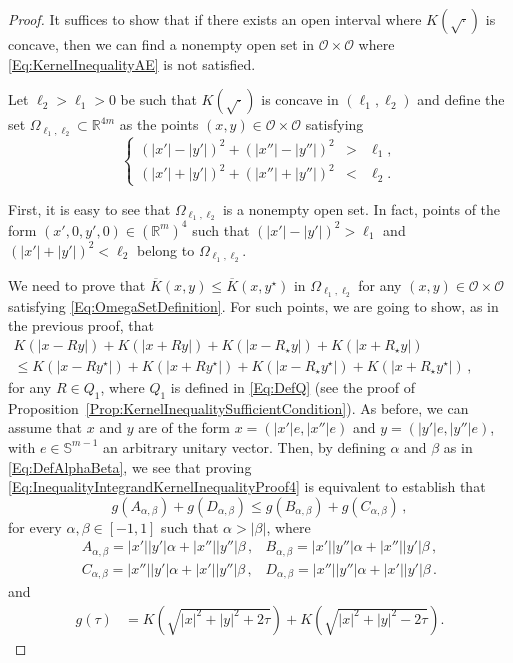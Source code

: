 \documentclass[12pt,reqno]{amsart}
\theoremstyle{definition}
\theoremstyle{remark}
\newcommand{\con}[1]{\mathbb{#1}}
\newcommand{\R}{\con{R}} %
\newcommand{\Sph}{\con{S}} %
\newcommand{\ocal}{\mathcal{O}}
\newcommand\beqc[1]{\left\{\begin{array}{#1}}
\newcommand\eeqc{\end{array} \right.}
\def\PDEsystem{rcll}
\numberwithin{equation}{section}
\begin{document}
\begin{proof}
	It suffices to show that if there exists an open interval where $K(\sqrt{\cdot})$ is concave, then we can find a nonempty open set in $\ocal \times \ocal$ where \eqref{Eq:KernelInequalityAE} is not satisfied.
	
	Let $\ell_2>\ell_1>0$ be such that $K(\sqrt{\cdot})$ is concave in $(\ell_1,\ell_2)$ and define the set $\Omega_{\ell_1,\ell_2}\subset \R^{4m}$ as the points $(x,y)\in \ocal\times \ocal$ satisfying
	\begin{equation}
	\label{Eq:OmegaSetDefinition}
	\beqc{\PDEsystem}
	(|x'|-|y'|)^2+(|x''|-|y''|)^2&>&\ell_1,\\
	(|x'|+|y'|)^2+(|x''|+|y''|)^2&<&\ell_2.
	\eeqc
	\end{equation}
	
	First, it is easy to see that $\Omega_{\ell_1,\ell_2}$ is a nonempty open set. In fact, points of the form $(x',0,y',0)\in (\R^m)^4$ such that $(|x'|-|y'|)^2>\ell_1$ and $(|x'|+|y'|)^2 <\ell_2$ belong to $\Omega_{\ell_1,\ell_2}$. 
	
	We need to prove that $\overline{K}(x,y) \leq \overline{K}(x, y^\star)$ in $\Omega_{\ell_1,\ell_2}$ for any $(x,y)\in \ocal\times \ocal$ satisfying \eqref{Eq:OmegaSetDefinition}. For such points, we are going to show, as in the previous proof, that
	\begin{equation}
	\label{Eq:InequalityIntegrandKernelInequalityProof4}
	\begin{split}
	K(|x - R y|) + K(|x + R y|) + K(|x - R_\star y|) + K(|x + R_\star y|)
	\quad \quad \quad \quad \quad \quad
	\\
	\leq
	K(|x - R y^\star|) + K(|x + R y^\star|)+K(|x - R_\star y^\star|) + K(|x + R_\star y^\star|)\,, 
	\end{split}
	\end{equation}
	for any $R\in Q_1$, where $Q_1$ is defined in \eqref{Eq:DefQ} (see the proof of Proposition~\ref{Prop:KernelInequalitySufficientCondition}). As before, we can assume that $x$ and $y$ are of the form $x = (|x'|e, |x''|e)$ and $y = (|y'|e, |y''|e)$, with $e \in \Sph^{m-1}$ an arbitrary unitary vector. Then, by defining $\alpha$ and $\beta$ as in \eqref{Eq:DefAlphaBeta}, we see that proving \eqref{Eq:InequalityIntegrandKernelInequalityProof4} is equivalent to establish that
	\begin{equation}
	\label{Eq:InequalityIntegrandKernelInequalityProof5}
	g(A_{\alpha,\beta}) + g(D_{\alpha,\beta}) \leq g(B_{\alpha,\beta}) + g(C_{\alpha,\beta})\,,
	\end{equation}
	for every $\alpha, \beta \in [-1,1]$ such that $\alpha>|\beta|$, where
	$$
	\begin{array}{cc}
	A_{\alpha,\beta} = |x'||y'|  \alpha + |x''||y''|\beta \,, &
	B_{\alpha,\beta} = |x'||y''| \alpha + |x''||y'| \beta \,, \\
	C_{\alpha,\beta} = |x''||y'| \alpha + |x'||y''| \beta \,, &
	D_{\alpha,\beta} = |x''||y''|\alpha + |x'||y'|  \beta \,.
	\end{array}
	$$
	and
	\begin{align*}
	g(\tau) &= K\left( \sqrt{|x|^2+|y|^2+2\tau} \right) + K\left( \sqrt{|x|^2+|y|^2-2\tau} \right).
	\end{align*}
	

\end{proof}
\end{document}
